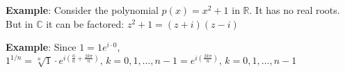 \textbf{Example}: Consider the polynomial $p(x) = x^2 + 1$ in $\mathbb{R}$. It has no real roots. But in $\mathbb{C}$ it can be factored: $z^2 + 1 = (z + i) (z - i)$


\textbf{Example}: Since $1 = 1 e^{i \cdot 0}$, $1^{1/n} = \sqrt[n]{1} \cdot e^{i (\frac{0}{n} + \frac{2k \pi}{n})}, \, k = 0, 1, \dots, n - 1 = e^{i (\frac{2k \pi}{n})}, \, k = 0, 1, \dots, n - 1$

